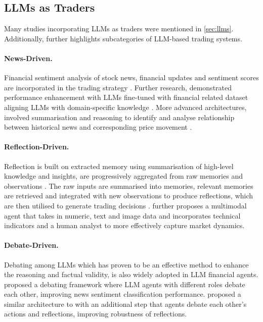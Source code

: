 \documentclass[12pt, a4paper]{report}
\begin{document}
\subsection{LLMs as Traders}
\label{sec:llm-traders}
Many studies incorporating LLMs as traders were mentioned in \cref{sec:llms}. Additionally, \cite{ding2024survey} further highlights 
subcategories of LLM-based trading systems.

\paragraph{News-Driven.}

Financial sentiment analysis of stock news, financial updates and sentiment scores are incorporated in the trading strategy \cite{lopezlira2023, wu2024llmnews}.
Further research, demonstrated performance enhancement with LLMs fine-tuned with financial related dataset aligning LLMs with domain-specific knowledge \cite{kirtac2024, zhang2024chinese}.
More advanced architectures, involved summarisation and reasoning to identify and analyse relationship between historical news and corresponding price movement \cite{fatouros2024, wang2024llmfactor}.

\paragraph{Reflection-Driven.}

Reflection is built on extracted memory using summarisation of high-level knowledge and insights, are progressively aggregated from raw memories and observations \cite{park2023generative}.
The raw inputs are summarised into memories, relevant memories are retrieved and integrated with new observations to produce reflections, which are then utilised to generate trading decisions \cite{yu2023finmem}.
\cite{zhang2024finagent} further proposes a multimodal agent that takes in numeric, text and image data and incorporates technical indicators and a human analyst to more effectively capture market dynamics.

\paragraph{Debate-Driven.}

Debating among LLMs which has proven to be an effective method to enhance the reasoning and factual validity, is also widely adopted in LLM financial agents.
\cite{xing2024} proposed a debating framework where LLM agents with different roles debate each other, improving news sentiment classification performance.
\cite{li2023tradinggpt} proposed a similar architecture to \cite{yu2023finmem} with an additional step that agents debate each other’s actions and reflections, improving robustness of reflections.
\end{document}
